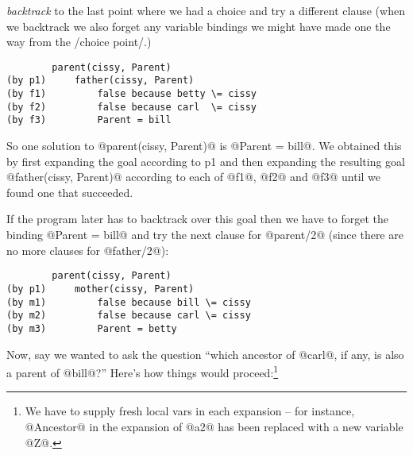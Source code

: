 \emph{backtrack} to the last point where we had a choice and try a
different clause (when we backtrack we also forget any
variable bindings we might have made one the way from the
/choice point/.)
\begin{verbatim}
        parent(cissy, Parent)
(by p1)     father(cissy, Parent)
(by f1)         false because betty \= cissy
(by f2)         false because carl  \= cissy
(by f3)         Parent = bill
\end{verbatim}
So one solution to @parent(cissy, Parent)@ is @Parent = bill@.  We
obtained this by first expanding the goal according to p1 and
then expanding the resulting goal @father(cissy, Parent)@
according to each of @f1@, @f2@ and @f3@ until we found one that
succeeded.

If the program later has to backtrack over this goal then we
have to forget the binding @Parent = bill@ and try the next
clause for @parent/2@ (since there are no more clauses for
@father/2@):
\begin{verbatim}
        parent(cissy, Parent)
(by p1)     mother(cissy, Parent)
(by m1)         false because bill \= cissy
(by m2)         false because carl \= cissy
(by m3)         Parent = betty
\end{verbatim}
Now, say we wanted to ask the question ``which ancestor of
@carl@, if any, is also a parent of @bill@?''  Here's how things
would proceed:\footnote{We have to supply fresh local vars in each
 expansion -- for instance, @Ancestor@ in the expansion of @a2@ has
 been replaced with a new variable @Z@.}
